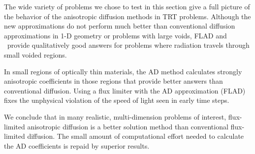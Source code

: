 The wide variety of problems we chose to test in this section give a full
picture of the behavior of the anisotropic diffusion methods in TRT problems.
Although the new approximations do not perform much better than conventional
diffusion approximations in 1-D geometry or problems with large voids, FLAD and
\APone\ provide qualitatively good answers for problems where radiation travels
through small voided regions.

In small regions of optically thin materials, the AD method calculates strongly
anisotropic coefficients in those regions that provide better
answers than conventional diffusion. Using a flux limiter with the AD
approximation (FLAD) fixes the unphysical violation of the speed of light
seen in early time steps.

We conclude that in many realistic, multi-dimension problems of interest,
flux-limited anisotropic diffusion is a better solution method than
conventional flux-limited diffusion. The small amount of computational effort
needed to calculate the AD coefficients is repaid by superior results.

